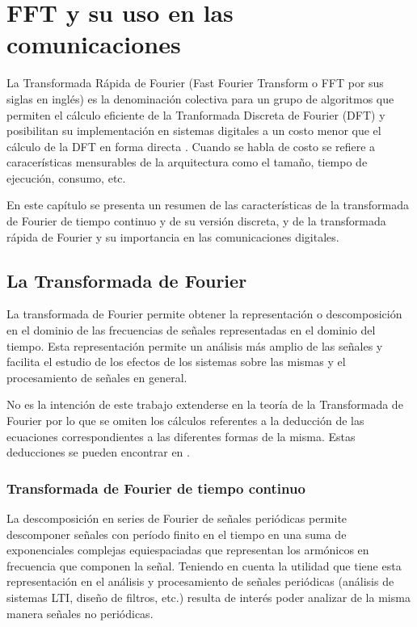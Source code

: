 \chapter{FFT y su uso en las comunicaciones}

La Transformada Rápida de Fourier (Fast Fourier Transform o FFT por sus siglas
en inglés) es la denominación colectiva para un grupo de algoritmos que permiten
el cálculo eficiente de la Tranformada Discreta de Fourier (DFT) y posibilitan
su implementación en sistemas digitales a un costo menor que el cálculo de la DFT en forma
directa \cite{Schaffer2_1}. Cuando se habla de costo se refiere a caracerísticas mensurables de la
arquitectura como el tamaño, tiempo de ejecución, consumo, etc.

En este capítulo se presenta un resumen de las características de la
transformada de Fourier de tiempo continuo y de su versión discreta, y de la transformada rápida de
Fourier y su importancia en las comunicaciones digitales.

\section{La Transformada de Fourier}

La transformada de Fourier permite obtener la representación o descomposición en
el dominio de las frecuencias de señales representadas en el dominio del tiempo. Esta
representación permite un análisis más amplio de las señales y facilita el estudio de 
los efectos de los sistemas sobre las mismas y el procesamiento de señales
en general.

No es la intención de este trabajo extenderse en la teoría de la Transformada de
Fourier por lo que se omiten los cálculos referentes a la deducción de las
ecuaciones correspondientes a las diferentes formas de la misma. Estas deducciones se pueden
encontrar en \cite{Schaffer2_2}\cite{Meyer2_1}.
 
\subsection{Transformada de Fourier de tiempo continuo}

La descomposición en series de Fourier de señales periódicas permite descomponer señales con período
finito en el tiempo en una suma de exponenciales complejas equiespaciadas que representan los
armónicos en frecuencia que componen la señal. Teniendo en cuenta la utilidad que tiene esta
representación en el análisis y procesamiento de señales periódicas (análisis de sistemas LTI,
diseño de filtros, etc.) resulta de interés poder analizar de la misma manera señales no periódicas.

